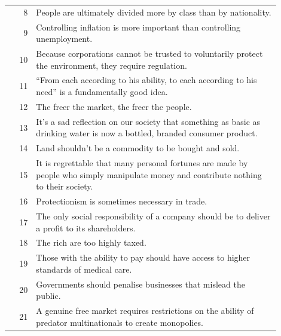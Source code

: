 \documentclass[11pt]{article}
\begin{document}
\begin{longtable}{r p{0.9\linewidth}}
\rowcolor{dom2} 8  & People are ultimately divided more by class than by nationality. \\
\rowcolor{dom2} 9  & Controlling inflation is more important than controlling unemployment. \\
\rowcolor{dom2} 10 & Because corporations cannot be trusted to voluntarily protect the environment, they require regulation. \\
\rowcolor{dom2} 11 & ``From each according to his ability, to each according to his need'' is a fundamentally good idea. \\
\rowcolor{dom2} 12 & The freer the market, the freer the people. \\
\rowcolor{dom2} 13 & It's a sad reflection on our society that something as basic as drinking water is now a bottled, branded consumer product. \\
\rowcolor{dom2} 14 & Land shouldn't be a commodity to be bought and sold. \\
\rowcolor{dom2} 15 & It is regrettable that many personal fortunes are made by people who simply manipulate money and contribute nothing to their society. \\
\rowcolor{dom2} 16 & Protectionism is sometimes necessary in trade. \\
\rowcolor{dom2} 17 & The only social responsibility of a company should be to deliver a profit to its shareholders. \\
\rowcolor{dom2} 18 & The rich are too highly taxed. \\
\rowcolor{dom2} 19 & Those with the ability to pay should have access to higher standards of medical care. \\
\rowcolor{dom2} 20 & Governments should penalise businesses that mislead the public. \\
\rowcolor{dom2} 21 & A genuine free market requires restrictions on the ability of predator multinationals to create monopolies. \\


\end{longtable}
\end{document}
